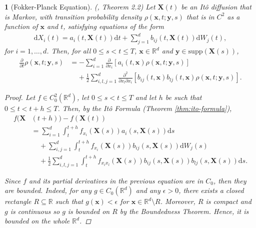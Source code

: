 \documentclass[english]{article}
\numberwithin{equation}{section}
\numberwithin{figure}{section}
\theoremstyle{bolddescit}
\newtheorem{theorem}{\protect\theoremname}[section]
\theoremstyle{definition}
\theoremstyle{definition}
\theoremstyle{plain}
\theoremstyle{plain}
\theoremstyle{bolddesc}
\theoremstyle{plain}
\theoremstyle{remark}
\providecommand{\theoremname}{Theorem}
\begin{document}
\begin{theorem}[Fokker-Planck Equation]\label{thm:fokker-planck}
  (\cite{pavliotis_stochastic_2014}, Theorem 2.2)
  Let $\mathbf{X}(t)$ be an It\^o diffusion that is Markov, with transition probability density $\rho(\mathbf{x},t;\mathbf{y},s)$ that is in $C^2$ as a function of $\mathbf{x}$ and $t$, satisfying equations of the form
  \begin{align*}
    \mathrm{d}X_i(t) = a_i(t, \mathbf{X}(t)) \mathrm{d}t + \sum_{j=1}^d b_{ij}(t, \mathbf{X}(t)) \mathrm{d}W_j(t),
  \end{align*}
  for $i=1,\ldots,d$. Then, for all $0 \le s < t \le T$, $\mathbf{x} \in \mathbb{R}^d$ and $\mathbf{y} \in \mathrm{supp}(\mathbf{X}(s))$,
  \begin{align*}
    \frac{\partial}{\partial t}\rho(\mathbf{x},t;\mathbf{y},s)
    &= - \sum_{i=1}^d \frac{\partial}{\partial x_i}[a_i(t,\mathbf{x})\rho(\mathbf{x},t;\mathbf{y},s)]\\
      &\ \ \ \ \ + \frac{1}{2} \sum_{i,l,j=1}^{d} \frac{\partial^2}{\partial x_l \partial x_i}[b_{ij}(t,\mathbf{x}) b_{lj}(t,\mathbf{x}) \rho(\mathbf{x},t;\mathbf{y},s)].
  \end{align*}

  \begin{proof}
    Let $f \in C^2_0(\mathbb{R}^d)$, let $0 \le s < t \le T$ and let $h$ be such that $0 \le t < t + h \le T$. Then, by the It\^o Formula (Theorem \ref{thm:ito-formula}),
    \begin{align*}
      f(\mathbf{X}&(t+h)) - f(\mathbf{X}(t))\\
      &= \sum_{i=1}^{d} \int_t^{t+h} f_{x_i}(\mathbf{X}(s)) a_i(s,\mathbf{X}(s)) \mathrm{d}s\\
        &\ \ \ \ \ + \sum_{i,j=1}^{d} \int_t^{t+h} f_{x_i}(\mathbf{X}(s)) b_{ij}(s,\mathbf{X}(s)) \mathrm{d}W_j(s)\\
        &\ \ \ \ \ + \frac{1}{2} \sum_{i,l,j=1}^{d} \int_t^{t+h} f_{x_i x_l}(\mathbf{X}(s)) b_{ij}(s,\mathbf{X}(s)) b_{lj}(s,\mathbf{X}(s)) \mathrm{d}s.
    \end{align*}

    Since $f$ and its partial derivatives in the previous equation are in $C_0$, then they are bounded. Indeed, for any $g \in C_0(\mathbb{R}^d)$ and any $\epsilon > 0$, there exists a closed rectangle $R \subseteq \mathbb{R}$ such that $g(\mathbf{x}) < \epsilon$ for $\mathbf{x} \in \mathbb{R}^d \setminus R$. Moreover, $R$ is compact and $g$ is continuous so $g$ is bounded on $R$ by the Boundedness Theorem. Hence, it is bounded on the whole $\mathbb{R}^d$.


\end{proof}
\end{theorem}
\end{document}
